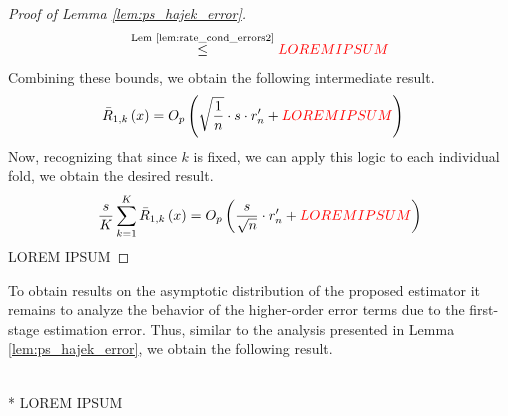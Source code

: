 \begin{proof}[Proof of Lemma \ref{lem:ps_hajek_error}]
\begin{equation}
\begin{aligned}
            \overset{\text{Lem \ref{lem:rate_cond_errors2}}}{\leq} {\color{red} LOREM IPSUM}
        \end{aligned}
    \end{equation}
    Combining these bounds, we obtain the following intermediate result.
    \begin{equation}
        \begin{aligned}
            \bar{R}_{1, k}\left(x\right)
            & = O_{p}\left(\sqrt{\frac{1}{n}} \cdot s \cdot r_{n}^{\prime} + {\color{red} LOREM IPSUM}\right)
        \end{aligned}
    \end{equation}
    Now, recognizing that since $k$ is fixed, we can apply this logic to each individual fold, we obtain the desired result.
    \begin{equation}
        \begin{aligned}
            \frac{s}{K} \sum_{k = 1}^{K} \bar{R}_{1, k}\left(x\right) 
            = O_{p}\left(\frac{s}{\sqrt{n}} \cdot r_{n}^{\prime} + {\color{red} LOREM IPSUM}\right)
        \end{aligned}
    \end{equation}
{\color{red} LOREM IPSUM}
\end{proof}

\newpage

To obtain results on the asymptotic distribution of the proposed estimator it remains to analyze the behavior of the higher-order error terms due to the first-stage estimation error.
Thus, similar to the analysis presented in Lemma \ref{lem:ps_hajek_error}, we obtain the following result.

\begin{boxD}
    \begin{lem}\label{lem:HO_error}\mbox{}\\*
        {\color{red} LOREM IPSUM}
    \end{lem}    
\end{boxD}



